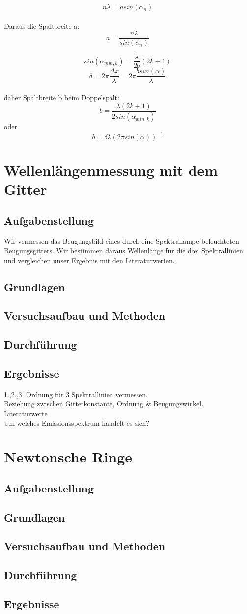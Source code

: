 \documentclass{article}
\begin{document}
$$n\lambda=a sin(\alpha_n)$$\\
Daraus die Spaltbreite a:
$$a=\frac{n\lambda}{sin(\alpha_n)}$$

$$sin(\alpha_{min,k})=\frac{\lambda}{2b}(2k+1)$$
$$\delta=2\pi\frac{\Delta x}{\lambda}=2\pi\frac{b sin(\alpha)}{\lambda}$$\\
daher Spaltbreite b beim Doppelspalt:\\
$$b=\frac{\lambda (2k+1)}{2sin(\alpha_{min,k})}$$
oder
$$b=\delta\lambda(2\pi sin(\alpha))^{-1}$$
\section{Wellenlängenmessung mit dem Gitter}

\subsection{Aufgabenstellung}
Wir vermessen das Beugungsbild eines durch eine Spektrallampe beleuchteten Beugungsgitters. Wir bestimmen daraus Wellenlänge für die drei Spektrallinien und vergleichen unser Ergebnis mit den Literaturwerten.
\subsection{Grundlagen}
\subsection{Versuchsaufbau und Methoden}
\subsection{Durchführung}
\subsection{Ergebnisse}
1.,2.,3. Ordnung für 3 Spektrallinien vermessen.\\
Beziehung zwischen Gitterkonstante, Ordnung & Beugungswinkel.\\
Literaturwerte\\
Um welches Emissionsspektrum handelt es sich?\\

\section{Newtonsche Ringe}

\subsection{Aufgabenstellung}
\subsection{Grundlagen}
\subsection{Versuchsaufbau und Methoden}
\subsection{Durchführung}
\subsection{Ergebnisse}
\end{document}
